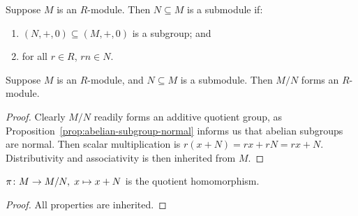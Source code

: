 
\begin{definition}
    Suppose \(M\) is an \(R\)-module.
    Then \(N \subseteq M\) is a submodule if:
    \begin{enumerate}[label={(\roman*)}, itemsep=0mm]
        \item \((N,+,0) \subseteq (M,+,0)\) is a subgroup; and
        \item for all \(r \in R\), \(rn \in N\).
    \end{enumerate}
\end{definition}
\begin{lemma}
    Suppose \(M\) is an \(R\)-module,
    and \(N \subseteq M\) is a submodule.
    Then \(M/N\) forms an \(R\)-module.
\end{lemma}
\begin{proof}
    Clearly \(M/N\) readily forms an additive quotient group,
    as Proposition~\ref{prop:abelian-subgroup-normal} informs us that abelian subgroups are normal.
    Then scalar multiplication is \(r(x+N) = rx + rN = rx + N\).
    Distributivity and associativity is then inherited from \(M\).
\end{proof}
\begin{corollary}
    \(\pi\colon M\to M/N,\;x\mapsto x+N\) is the quotient homomorphism.
\end{corollary}
\begin{proof}
    All properties are inherited.
\end{proof}

